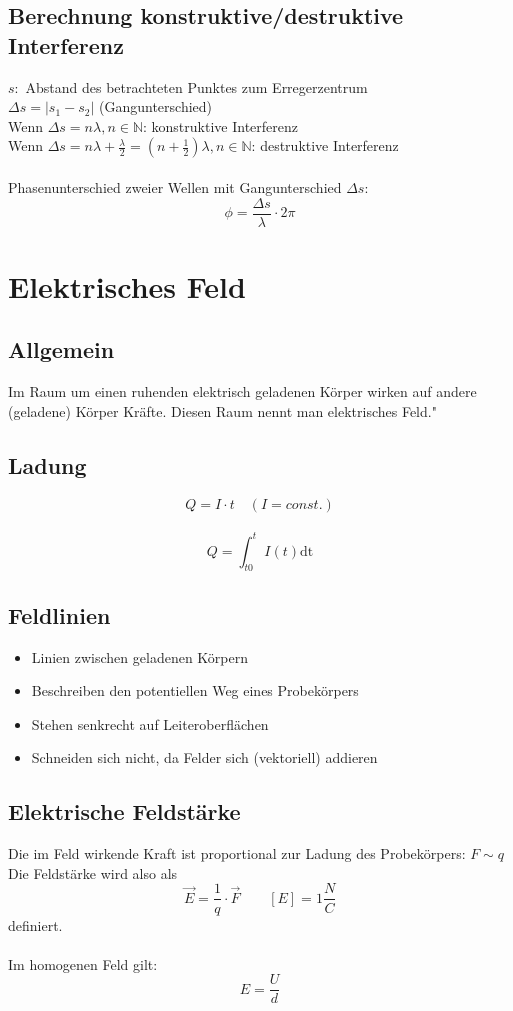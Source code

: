 \documentclass[12pt,a4paper,titlepage]{article}
\begin{document}
			\subsection{Berechnung konstruktive/destruktive Interferenz}
			$s:$ Abstand des betrachteten Punktes zum Erregerzentrum \\
			$\Delta s = |s_1 - s_2|$ (Gangunterschied)\\
			Wenn $\Delta s = n \lambda, n \in \mathbb{N}$: konstruktive Interferenz\\
			Wenn $\Delta s = n \lambda + \frac{\lambda}{2} = (n+\frac{1}{2}) \lambda, n \in \mathbb{N}$: destruktive Interferenz\\\\
			Phasenunterschied zweier Wellen mit Gangunterschied $\Delta s$:\\
			$$\phi = \frac{\Delta s}{\lambda} \cdot 2 \pi$$
	\pagebreak
	\section{Elektrisches Feld}
		\subsection{Allgemein}
			\glqq Im Raum um einen ruhenden elektrisch geladenen Körper wirken auf andere (geladene) Körper Kräfte. Diesen Raum nennt man elektrisches Feld."
		\subsection{Ladung}
			$$Q = I \cdot t \quad (I = const.)$$ \\
			$$Q = \int_{t0}^t I(t) \mathrm{d}\mathrm{t}$$ 
		\subsection{Feldlinien}
			\begin{itemize}
				\item Linien zwischen geladenen Körpern
				\item Beschreiben den potentiellen Weg eines Probekörpers
				\item Stehen senkrecht auf Leiteroberflächen
				\item Schneiden sich nicht, da Felder sich (vektoriell) addieren
			\end{itemize}
		\subsection{Elektrische Feldstärke}
			Die im Feld wirkende Kraft ist proportional zur Ladung des Probekörpers: 	
			$F \sim q$\\
			Die Feldstärke wird also als
			$$\vec{E} = \frac{1}{q} \cdot \vec{F} \qquad [E] = 1 \frac{N}{C}$$
			definiert. \\ \\
			Im homogenen Feld gilt: \\
			$$E = \frac{U}{d}$$
\end{document}
